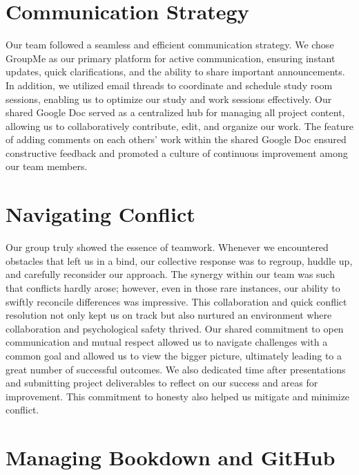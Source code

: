 \documentclass[
]{book}
\begin{document}
\hypertarget{communication-strategy}{%
\section{Communication Strategy}\label{communication-strategy}}

Our team followed a seamless and efficient communication strategy. We chose GroupMe as our primary platform for active communication, ensuring instant updates, quick clarifications, and the ability to share important announcements. In addition, we utilized email threads to coordinate and schedule study room sessions, enabling us to optimize our study and work sessions effectively. Our shared Google Doc served as a centralized hub for managing all project content, allowing us to collaboratively contribute, edit, and organize our work. The feature of adding comments on each others' work within the shared Google Doc ensured constructive feedback and promoted a culture of continuous improvement among our team members.

\hypertarget{navigating-conflict}{%
\section{Navigating Conflict}\label{navigating-conflict}}

Our group truly showed the essence of teamwork. Whenever we encountered obstacles that left us in a bind, our collective response was to regroup, huddle up, and carefully reconsider our approach. The synergy within our team was such that conflicts hardly arose; however, even in those rare instances, our ability to swiftly reconcile differences was impressive. This collaboration and quick conflict resolution not only kept us on track but also nurtured an environment where collaboration and psychological safety thrived. Our shared commitment to open communication and mutual respect allowed us to navigate challenges with a common goal and allowed us to view the bigger picture, ultimately leading to a great number of successful outcomes. We also dedicated time after presentations and submitting project deliverables to reflect on our success and areas for improvement. This commitment to honesty also helped us mitigate and minimize conflict.

\hypertarget{managing-bookdown-and-github}{%
\section{Managing Bookdown and GitHub}\label{managing-bookdown-and-github}}
\end{document}
